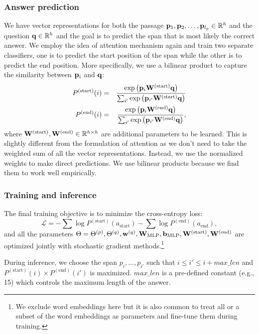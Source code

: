 \subsubsection*{Answer prediction}
We have vector representations for both the passage $\mathbf{p}_1, \mathbf{p}_2, \ldots, \mathbf{p}_{l_p} \in \mathbb{R}^h$ and the question $\mathbf{q} \in \mathbb{R}^h$ and the goal is to predict the span that is most likely the correct answer. We employ the idea of attention mechanism again and train two separate classifiers, one is to predict the start position of the span while the other is to predict the end position. More specifically, we use a bilinear product to capture the similarity between $\mathbf{p}_i$ and $\mathbf{q}$:
\begin{eqnarray}
P^{(\text{start})}(i) & = & \frac{\exp\left(\mathbf{p}_i \mathbf{W}^{(\text{start})} \mathbf{q}\right)}{\sum_{i'}\exp\left(\mathbf{p}_{i'} \mathbf{W}^{(\text{start})} \mathbf{q}\right)} \\
P^{(\text{end})}(i) & = & \frac{\exp\left(\mathbf{p}_i \mathbf{W}^{(\text{end})} \mathbf{q}\right)}{\sum_{i'}\exp\left(\mathbf{p}_{i'} \mathbf{W}^{(\text{end})} \mathbf{q}\right)},
\end{eqnarray}
where $\mathbf{W}^{(\text{start})}, \mathbf{W}^{(\text{end})} \in \mathbb{R}^{h \times h}$ are additional parameters to be learned. This is slightly different from the formulation of attention as we don't need to take the weighted sum of all the vector representations. Instead, we use the normalized weights to make direct predictions. We use bilinear products because we find them to work well empirically.

\subsubsection*{Training and inference}
The final training objective is to minimize the cross-entropy loss:
\begin{equation}
    \mathcal{L} = - \sum \log{P^{(\text{start})}(a_{\text{start}})} - \sum \log{P^{(\text{end})}(a_{\text{end}})},
\end{equation}
and all the parameters $\Theta = \Theta^{(p)}, \Theta^{(q)}, \mathbf{w}^{(q)}, \mathbf{W}_{\text{MLP}}, \mathbf{b}_{\text{MLP}}, \mathbf{W}^{(\text{start})}, \mathbf{W}^{(\text{end})}$ are optimized jointly with stochastic gradient methods.\footnote{We exclude word embeddings here but it is also common to treat all or a subset of the word embeddings as parameters and fine-tune them during training.}

During inference, we choose the span $p_i, \ldots, p_{i'}$ such that $i \leq i' \leq i + max\_len$ and $P^{(\text{start})}(i) \times P^{(\text{end})}(i')$ is maximized. $max\_len$ is a pre-defined constant (e.g., 15) which controls the maximum length of the answer.

